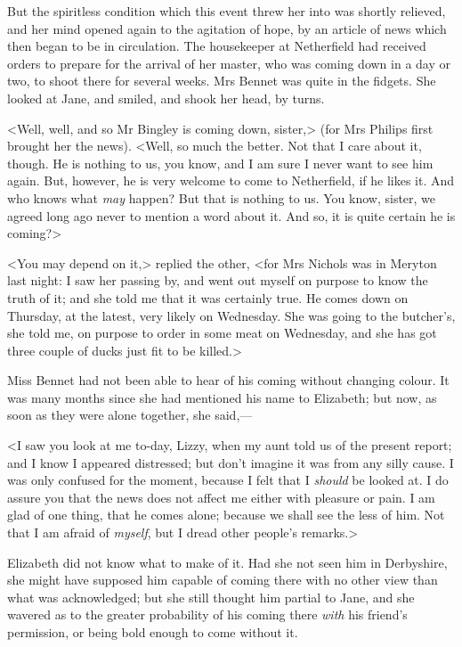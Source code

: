 But the spiritless condition which this event threw her into was shortly relieved, and her mind opened again to the agitation of hope, by an article of news which then began to be in circulation. The housekeeper at Netherfield had received orders to prepare for the arrival of her master, who was coming down in a day or two, to shoot there for several weeks. Mrs Bennet was quite in the fidgets. She looked at Jane, and smiled, and shook her head, by turns.

<Well, well, and so Mr Bingley is coming down, sister,> (for Mrs Philips first brought her the news). <Well, so much the better. Not that I care about it, though. He is nothing to us, you know, and I am sure I never want to see him again. But, however, he is very welcome to come to Netherfield, if he likes it. And who knows what \textit{may} happen? But that is nothing to us. You know, sister, we agreed long ago never to mention a word about it. And so, it is quite certain he is coming?>

<You may depend on it,> replied the other, <for Mrs Nichols was in Meryton last night: I saw her passing by, and went out myself on purpose to know the truth of it; and she told me that it was certainly true. He comes down on Thursday, at the latest, very likely on Wednesday. She was going to the butcher's, she told me, on purpose to order in some meat on Wednesday, and she has got three couple of ducks just fit to be killed.>

Miss Bennet had not been able to hear of his coming without changing colour. It was many months since she had mentioned his name to Elizabeth; but now, as soon as they were alone together, she said,—

<I saw you look at me to-day, Lizzy, when my aunt told us of the present report; and I know I appeared distressed; but don't imagine it was from any silly cause. I was only confused for the moment, because I felt that I \textit{should} be looked at. I do assure you that the news does not affect me either with pleasure or pain. I am glad of one thing, that he comes alone; because we shall see the less of him. Not that I am afraid of \textit{myself}, but I dread other people's remarks.>

Elizabeth did not know what to make of it. Had she not seen him in Derbyshire, she might have supposed him capable of coming there with no other view than what was acknowledged; but she still thought him partial to Jane, and she wavered as to the greater probability of his coming there \textit{with} his friend's permission, or being bold enough to come without it.

